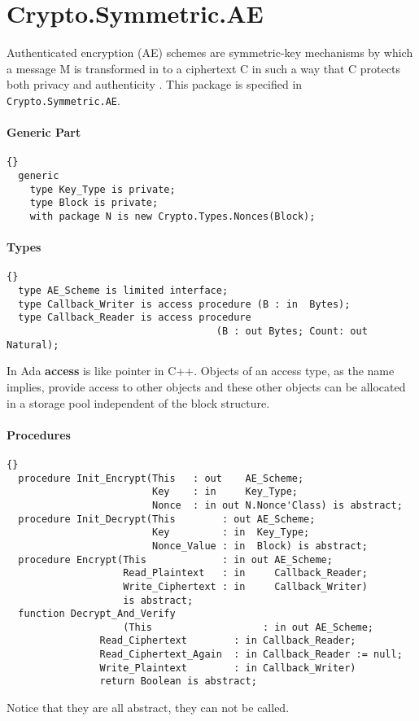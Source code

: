\chapter{Crypto.Symmetric.AE}\label{AE}
Authenticated encryption (AE) schemes are symmetric-key mechanisms by which a message M is transformed in to a ciphertext C in such a way that C protects both privacy and authenticity \cite{DBLP:journals/iacr/BellareRW03}. This package is specified in \texttt{Crypto.Symmetric.AE}.
\subsubsection*{Generic Part}
\begin{lstlisting}{}
  generic
    type Key_Type is private;
    type Block is private;
    with package N is new Crypto.Types.Nonces(Block);
\end{lstlisting}
\subsubsection*{Types}
\begin{lstlisting}{}
  type AE_Scheme is limited interface;
  type Callback_Writer is access procedure (B : in  Bytes);
  type Callback_Reader is access procedure 
  									(B : out Bytes; Count: out Natural);
\end{lstlisting}
In Ada \textbf{access} is like pointer in C++. Objects of an access type, as the name implies, provide access to other objects and these other objects can be allocated in a storage pool independent of the block structure.\\
\subsubsection*{Procedures}
\begin{lstlisting}{}
  procedure Init_Encrypt(This   : out    AE_Scheme;
                         Key    : in     Key_Type;
                         Nonce  : in out N.Nonce'Class) is abstract;
  procedure Init_Decrypt(This        : out AE_Scheme;
                         Key         : in  Key_Type;
                         Nonce_Value : in  Block) is abstract;
  procedure Encrypt(This             : in out AE_Scheme;
                    Read_Plaintext   : in     Callback_Reader;
                    Write_Ciphertext : in     Callback_Writer) 
                    is abstract;
  function Decrypt_And_Verify
  					(This                   : in out AE_Scheme;
                Read_Ciphertext        : in Callback_Reader;
                Read_Ciphertext_Again  : in Callback_Reader := null;
                Write_Plaintext        : in Callback_Writer)
                return Boolean is abstract;
\end{lstlisting}
Notice that they are all abstract, they can not be called.\\
